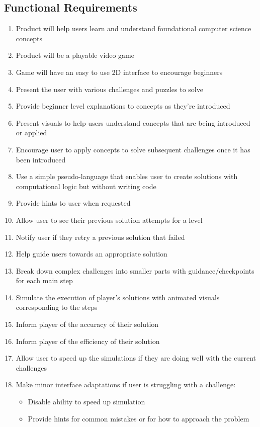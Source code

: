 \subsection{Functional Requirements}
\begin{enumerate}
	\item Product will help users learn and understand foundational computer science 
		concepts
	\item Product will be a playable video game
	\item Game will have an easy to use 2D interface to encourage beginners
	\item Present the user with various challenges and puzzles to solve
	\item Provide beginner level explanations to concepts as they’re introduced
	\item Present visuals to help users understand concepts that are being
		introduced or applied
	\item Encourage user to apply concepts to solve subsequent challenges once it has
		been introduced
	\item Use a simple pseudo-language that enables user to create solutions with
		computational logic but without writing code
	\item Provide hints to user when requested
	\item Allow user to see their previous solution attempts for a level
	\item Notify user if they retry a previous solution that failed
	\item Help guide users towards an appropriate solution
	\item Break down complex challenges into smaller parts with guidance/checkpoints 
		for each main step
	\item Simulate the execution of player’s solutions with animated visuals
		corresponding to the steps
	\item Inform player of the accuracy of their solution
	\item Inform player of the efficiency of their solution
	\item Allow user to speed up the simulations if they are doing well with the
		current challenges
	\item Make minor interface adaptations if user is struggling with a challenge:
		\begin{itemize}
		\item Disable ability to speed up simulation
		\item Provide hints for common mistakes or for how to approach the problem

\end{itemize}
\end{enumerate}
